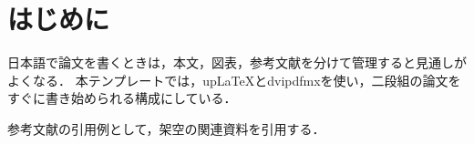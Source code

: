 \section{はじめに}

日本語で論文を書くときは，本文，図表，参考文献を分けて管理すると見通しがよくなる．
本テンプレートでは，upLaTeXとdvipdfmxを使い，二段組の論文をすぐに書き始められる構成にしている．

参考文献の引用例として，架空の関連資料を引用する\cite{sample2026template}．
